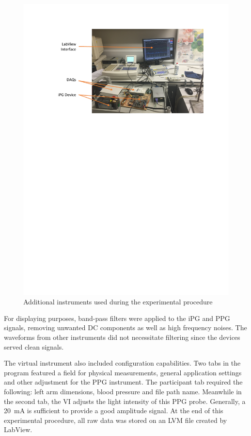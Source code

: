 \begin{figure}[!htpb]
	\centering
	\includegraphics[width=15cm,keepaspectratio]{figure2}
	\caption{Additional instruments used during the experimental procedure}
	\label{fig:experimental set-up 2}
\end{figure}

For displaying purposes, band-pass filters were applied to the iPG and PPG signals, removing unwanted DC components as well as high frequency noises. The waveforms from other instruments did not necessitate filtering since the devices served clean signals. 

The virtual instrument also included configuration capabilities. Two tabs in the program featured a field for physical measurements, general application settings and other adjustment for the PPG instrument. The participant tab required the following: left arm dimensions, blood pressure and file path name. Meanwhile in the second tab, the VI adjusts the light intensity of this PPG probe. Generally, a \SI{20}{\milli\ampere} is sufficient to provide a good amplitude signal. At the end of this experimental procedure, all raw data was stored on an LVM file created by LabView.

